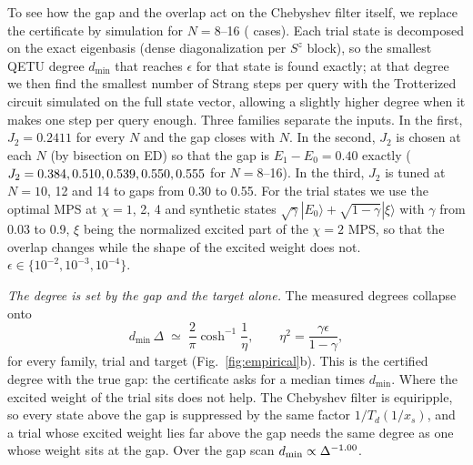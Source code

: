 \documentclass[aps,pra,twocolumn,superscriptaddress,nofootinbib]{revtex4-2}
\begin{document}
To see how the gap and the overlap act on the Chebyshev filter itself, we replace the certificate
by simulation for $N=8$--16 (\empN{} cases). Each trial state is decomposed on the exact eigenbasis
(dense diagonalization per $S^z$ block), so the smallest QETU degree $d_{\min}$ that reaches $\epsilon$ for
that state is found exactly; at that degree we then find the smallest number of Strang steps per
query with the Trotterized circuit simulated on the full state vector, allowing a slightly higher
degree when it makes one step per query enough. Three families separate the inputs. In the first,
$J_2=0.2411$ for every $N$ and the gap closes with $N$. In the second, $J_2$ is chosen at each $N$ (by
bisection on ED) so that the gap is $E_1-E_0=0.40$ exactly ($J_2=0.384, 0.510, 0.539, 0.550, 0.555$ for $N=8$--16). In the
third, $J_2$ is tuned at $N=10$, 12 and 14 to gaps from 0.30 to 0.55. For the trial states we use the
optimal MPS at $\chi=1$, 2, 4 and synthetic states $\sqrt{\gamma}|E_0\rangle+\sqrt{1-\gamma}|\xi\rangle$ with
$\gamma$ from 0.03 to 0.9, $\xi$ being the normalized excited part of the $\chi=2$ MPS, so that the overlap
changes while the shape of the excited weight does not. $\epsilon\in\{10^{-2},10^{-3},10^{-4}\}$.

\emph{The degree is set by the gap and the target alone.} The measured degrees collapse onto
\begin{equation}
d_{\min}\,\Delta\;\simeq\;\frac{2}{\pi}\cosh^{-1}\frac1\eta,\qquad \eta^2=\frac{\gamma\epsilon}{1-\gamma},
\label{eq:dmin}
\end{equation}
for every family, trial and target (Fig.~\ref{fig:empirical}b). This is the certified degree with the
true gap: the certificate asks for a median \empDegRatio{} times $d_{\min}$. Where the excited weight
of the trial sits does not help. The Chebyshev filter is equiripple, so every state above the gap is
suppressed by the same factor $1/T_d(1/x_s)$, and a trial whose excited weight lies far above the gap
needs the same degree as one whose weight sits at the gap. Over the gap scan $d_{\min}\propto\Delta^{-1.00}$.
\end{document}
